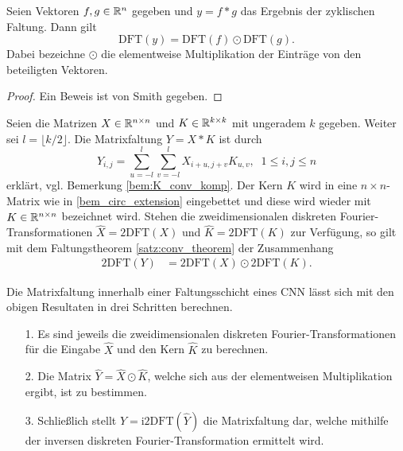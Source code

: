 \begin{satz}
    \label{satz:conv_theorem}
    Seien Vektoren $f,g \in \mathbb{R}^{n}$ gegeben und $y= f \ast g$ das Ergebnis der zyklischen Faltung. Dann gilt
    \begin{equation}
        \mathrm{DFT}(y)=\mathrm{DFT}(f) \odot \mathrm{DFT}(g).
    \end{equation}
    Dabei bezeichne $\odot$ die elementweise Multiplikation der Einträge von den beteiligten Vektoren.
\end{satz}
\begin{proof}
    Ein Beweis ist von Smith\cite{smith2007mathematics} gegeben.
\end{proof}
\begin{bem}
    Seien die Matrizen $X \in \mathbb{R}^{n \times n}$ und $K \in \mathbb{R}^{k \times k}$ mit ungeradem $k$ gegeben. Weiter sei $l=\lfloor k/2 \rfloor$. Die Matrixfaltung $Y= X \ast K$ ist durch
    \begin{equation*}
        Y_{i,j}=\sum_{u=-l}^l \sum_{v=-l}^l X_{i+u, j+v} K_{u,v}, \; \; 1 \leq i, j \leq n
    \end{equation*}
    erklärt, vgl. Bemerkung \ref{bem:K_conv_komp}.
    Der Kern $K$ wird in eine $n \times n$-Matrix wie in \ref{bem_circ_extension} eingebettet und diese wird wieder mit $K \in \mathbb{R}^{n \times n}$ bezeichnet wird. Stehen die zweidimensionalen diskreten Fourier-Transformationen $\hat{X}=\mathrm{2DFT}(X)$ und $\hat{K}=\mathrm{2DFT}(K)$ zur Verfügung, so gilt mit dem Faltungstheorem \ref{satz:conv_theorem} der Zusammenhang
    \begin{align*}
        \mathrm{2DFT}(Y)&=\mathrm{2DFT}(X) \odot \mathrm{2DFT}(K). 
    \end{align*}
\end{bem}
Die Matrixfaltung innerhalb einer Faltungsschicht eines CNN lässt sich mit den obigen Resultaten in drei Schritten berechnen.
\begin{itemize}
    \item[1.] Es sind jeweils die zweidimensionalen diskreten Fourier-Transformationen für die Eingabe $\hat{X}$ und den Kern $\hat{K}$ zu berechnen.
    \item[2.] Die Matrix $\hat{Y}= \hat{X} \odot \hat{K}$, welche sich aus der elementweisen Multiplikation ergibt, ist zu bestimmen.
    \item[3.] Schließlich stellt $Y=\mathrm{i2DFT}(\hat{Y})$ die Matrixfaltung dar, welche mithilfe der inversen diskreten Fourier-Transformation ermittelt wird.    
\end{itemize} 
